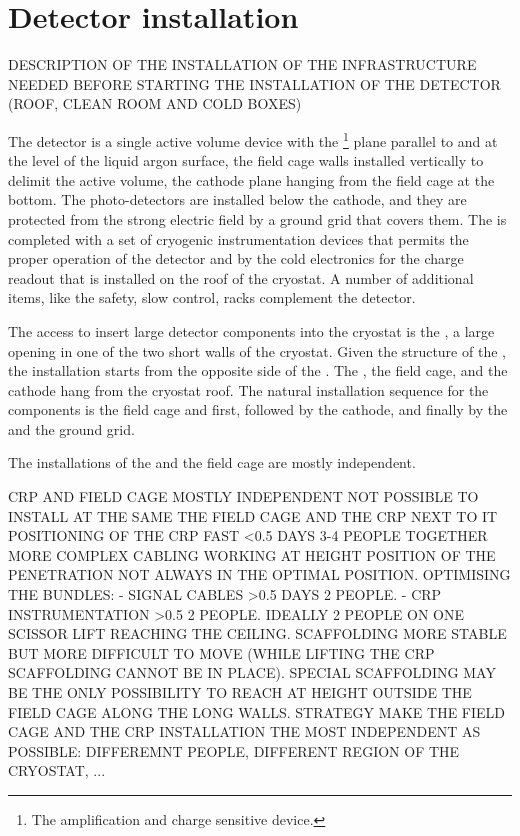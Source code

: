 \section{Detector installation}
\label{ch:dp-tc-installation}

DESCRIPTION OF THE INSTALLATION OF THE INFRASTRUCTURE NEEDED BEFORE STARTING THE INSTALLATION OF THE DETECTOR (ROOF, CLEAN ROOM AND COLD BOXES)

The  detector is a single active volume device with the \footnote{The amplification and charge sensitive device.} plane parallel to and at the level of the liquid argon surface, the field cage walls installed vertically to delimit the active volume, the cathode plane hanging from the field cage at the bottom.
The photo-detectors are installed below the cathode, and they are protected from the strong electric field by a ground grid that covers them.
The  is completed with a set of cryogenic instrumentation devices that permits the proper operation of the detector and by the cold electronics for the charge readout that is installed on the roof of the cryostat.
A number of additional items, like the safety, slow control,  racks complement the detector.

The access to insert large detector components into the cryostat is the , a large opening in one of the two short walls of the cryostat.
Given the structure of the , the installation starts from the opposite side of the .
The , the field cage, and the cathode hang from the cryostat roof.
The natural installation sequence for the  components is the field cage and  first, followed by the cathode, and finally by the  and the ground grid.

The installations of the  and the field cage are mostly independent.

CRP AND FIELD CAGE MOSTLY INDEPENDENT
NOT POSSIBLE TO INSTALL AT THE SAME THE FIELD CAGE AND THE CRP NEXT TO IT
POSITIONING OF THE CRP FAST <0.5 DAYS 3-4 PEOPLE TOGETHER
MORE COMPLEX CABLING WORKING AT HEIGHT POSITION OF THE PENETRATION NOT ALWAYS IN THE OPTIMAL POSITION.
OPTIMISING THE BUNDLES:
- SIGNAL CABLES >0.5 DAYS 2 PEOPLE.
- CRP INSTRUMENTATION >0.5 2 PEOPLE.
IDEALLY 2 PEOPLE ON ONE SCISSOR LIFT REACHING THE CEILING.
SCAFFOLDING MORE STABLE BUT MORE DIFFICULT TO MOVE (WHILE LIFTING THE CRP SCAFFOLDING CANNOT BE IN PLACE).
SPECIAL SCAFFOLDING MAY BE THE ONLY POSSIBILITY TO REACH AT HEIGHT OUTSIDE THE FIELD CAGE ALONG THE LONG WALLS.
STRATEGY MAKE THE FIELD CAGE AND THE CRP INSTALLATION THE MOST INDEPENDENT AS POSSIBLE: DIFFEREMNT PEOPLE, DIFFERENT REGION OF THE CRYOSTAT, ...

